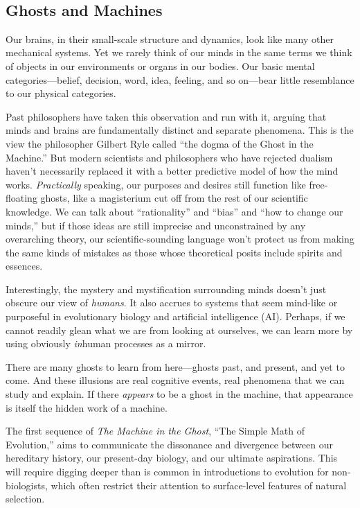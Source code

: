 {
 ~}

\subsection{Ghosts and Machines}

{
 Our brains, in their small-scale structure and dynamics, look like
many other mechanical systems. Yet we rarely think of our minds in the
same terms we think of objects in our environments or organs in our
bodies. Our basic mental categories---belief, decision, word, idea,
feeling, and so on---bear little resemblance to our physical
categories.}

{
 Past philosophers have taken this observation and run with it,
arguing that minds and brains are fundamentally distinct and separate
phenomena. This is the view the philosopher Gilbert Ryle called
``the dogma of the Ghost in the
Machine.'' But modern scientists
and philosophers who have rejected dualism haven't
necessarily replaced it with a better predictive model of how the mind
works. \textit{Practically} speaking, our purposes and desires still
function like free-floating ghosts, like a magisterium cut off from the
rest of our scientific knowledge. We can talk about
``rationality'' and
``bias'' and ``how
to change our minds,'' but if those ideas are still
imprecise and unconstrained by any overarching theory, our
scientific-sounding language won't protect us from
making the same kinds of mistakes as those whose theoretical posits
include spirits and essences.}

{
 Interestingly, the mystery and mystification surrounding minds
doesn't just obscure our view of \textit{humans}. It
also accrues to systems that seem mind-like or purposeful in
evolutionary biology and artificial intelligence (AI). Perhaps, if we
cannot readily glean what we are from looking at ourselves, we can
learn more by using obviously \textit{in}human processes as a mirror.}

{
 There are many ghosts to learn from here---ghosts past, and
present, and yet to come. And these illusions are real cognitive
events, real phenomena that we can study and explain. If there
\textit{appears} to be a ghost in the machine, that appearance is
itself the hidden work of a machine.}

{
 The first sequence of \textit{The Machine in the Ghost},
``The Simple Math of Evolution,''
aims to communicate the dissonance and divergence between our
hereditary history, our present-day biology, and our ultimate
aspirations. This will require digging deeper than is common in
introductions to evolution for non-biologists, which often restrict
their attention to surface-level features of natural selection.}

